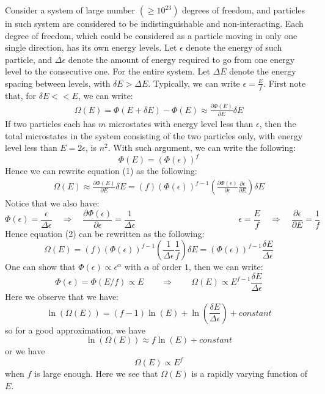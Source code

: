\documentclass[11pt,oneside]{book}
\theoremstyle{break}
\theoremstyle{break}
\begin{document}
Consider a system of large number $(\geq 10^{23})$ degrees of freedom, and particles in such system are considered to be indistinguishable and non-interacting. Each degree of freedom, which could be considered as a particle moving in only one single direction, has its own energy levels. Let $\epsilon$ denote the energy of such particle, and $\Delta \epsilon$ denote the amount of energy required to go from one energy level to the consecutive one. For the entire system. Let $\Delta E$ denote the energy spacing between levels, with $\delta E > \Delta E$. Typically, we can write $\epsilon = \frac{E}{f}$. First note that, for $\delta E <<E$, we can write:
\begin{align*}
\Omega(E) = \Phi(E+\delta E) - \Phi(E) \approx \frac{\partial \Phi(E)}{\partial E}\delta E \tag{1}
\end{align*}
If two particles each has $m$ microstates with energy level less than $\epsilon$, then the total microstates in the system consisting of the two particles only, with energy level less than $E = 2\epsilon$, is $n^2$. With such argument, we can write the following:
$$\Phi(E) = \left(\Phi(\epsilon)\right)^f$$
Hence we can rewrite equation (1) as the following:
\begin{align*}
\Omega(E) \approx \frac{\partial \Phi(E)}{\partial E}\delta E =  (f)(\Phi(\epsilon))^{f-1}\left(\frac{\partial \Phi(\epsilon)}{\partial \epsilon}\frac{\partial \epsilon}{\partial E}\right) \delta E \tag{2}
\end{align*}
Notice that we also have:
$$\Phi(\epsilon) = \frac{\epsilon}{\Delta \epsilon} \quad \Rightarrow \quad \frac{\partial \Phi(\epsilon)}{\partial \epsilon} = \frac{1}{\Delta \epsilon}\qquad\qquad\qquad\qquad\qquad\qquad \epsilon = \frac{E}{f}\quad \Rightarrow \quad \frac{\partial \epsilon}{\partial E} = \frac{1}{f}$$
Hence equation (2) can be rewritten as the following:
$$\Omega(E)  = (f)(\Phi(\epsilon))^{f-1}\left( \frac{1}{\Delta \epsilon}\frac{1}{f}\right) \delta E = (\Phi(\epsilon))^{f-1} \frac{\delta E}{\Delta \epsilon}$$
One can show that $\Phi(\epsilon) \propto \epsilon^\alpha$ with $\alpha$ of order $1$, then we can write: 
$$\Phi(\epsilon) = \Phi(E/f) \propto E \qquad \Rightarrow \qquad \Omega(E) \propto E^{f-1} \frac{\delta E}{\Delta \epsilon}$$
Here we observe that we have: 
$$\ln(\Omega(E)) = (f-1)\ln (E) + \ln \left( \frac{\delta E}{\Delta \epsilon}\right) + constant$$
so for a good approximation, we have
$$\ln(\Omega(E)) \approx f\ln(E) + constant$$
or we have 
$$\Omega(E) \propto E^f$$
when $f$ is large enough. Here we see that $\Omega(E)$ is a rapidly varying function of $E$.
\end{document}
